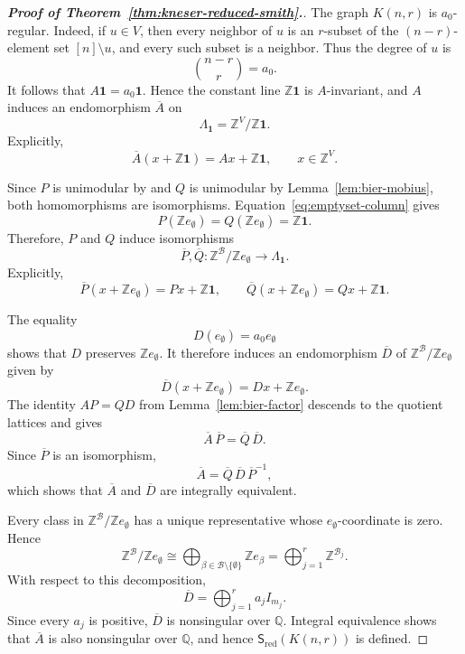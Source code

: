 \documentclass[11pt,reqno]{amsart}
\theoremstyle{plain}
\theoremstyle{definition}
\theoremstyle{remark}
\newcommand{\Sred}{\mathsf S_{\mathrm{red}}}
\newcommand{\Lamone}{\Lambda_{\mathbf1}}
\begin{document}
\begin{proof}[\textnormal{\textbf{Proof of Theorem~\ref{thm:kneser-reduced-smith}.}}]
The graph $K(n,r)$ is $a_0$-regular. Indeed, if $u\in V$, then every neighbor
of $u$ is an $r$-subset of the $(n-r)$-element set $[n]\setminus u$, and every
such subset is a neighbor. Thus the degree of $u$ is
\[
  \binom{n-r}{r}=a_0.
\]
It follows that $A\mathbf1=a_0\mathbf1$. Hence the constant line
$\mathbb Z\mathbf1$ is $A$-invariant, and $A$ induces an endomorphism
$\overline A$ on
\[
  \Lamone=\mathbb Z^V/\mathbb Z\mathbf1.
\]
Explicitly,
\[
  \overline A(x+\mathbb Z\mathbf1)
  =Ax+\mathbb Z\mathbf1,
  \qquad x\in\mathbb Z^V.
\]

Since $P$ is unimodular by \cite{Bie93} and $Q$ is unimodular by
Lemma~\ref{lem:bier-mobius}, both homomorphisms are isomorphisms.
Equation~\eqref{eq:emptyset-column} gives
\[
  P(\mathbb Ze_{\emptyset})
  =Q(\mathbb Ze_{\emptyset})
  =\mathbb Z\mathbf1.
\]
Therefore, $P$ and $Q$ induce isomorphisms
\[
  \overline P,\overline Q\colon
  \mathbb Z^{\mathcal B}/\mathbb Ze_{\emptyset}
  \longrightarrow
  \Lamone.
\]
Explicitly,
\[
  \overline P(x+\mathbb Ze_{\emptyset})
  =Px+\mathbb Z\mathbf1,
  \qquad
  \overline Q(x+\mathbb Ze_{\emptyset})
  =Qx+\mathbb Z\mathbf1.
\]

The equality
\[
  D(e_{\emptyset})=a_0e_{\emptyset}
\]
shows that $D$ preserves $\mathbb Ze_{\emptyset}$. It therefore
induces an endomorphism $\overline D$ of
$\mathbb Z^{\mathcal B}/\mathbb Ze_{\emptyset}$ given by
\[
  \overline D(x+\mathbb Ze_{\emptyset})
  =Dx+\mathbb Ze_{\emptyset}.
\]
The identity $AP=QD$ from Lemma~\ref{lem:bier-factor} descends to the quotient
lattices and gives
\[
  \overline A\,\overline P
  =\overline Q\,\overline D.
\]
Since $\overline P$ is an isomorphism,
\begin{equation}\label{eq:reduced-factorization}
  \overline A
  =\overline Q\,\overline D\,\overline P^{-1},
\end{equation}
which shows that $\overline A$ and $\overline D$ are integrally
equivalent.

Every class in $\mathbb Z^{\mathcal B}/\mathbb Ze_{\emptyset}$ has a unique
representative whose $e_{\emptyset}$-coordinate is zero. Hence
\[
  \mathbb Z^{\mathcal B}/\mathbb Ze_{\emptyset}
  \cong
  \bigoplus_{\beta\in\mathcal B\setminus\{\emptyset\}}
  \mathbb Ze_\beta
  =
  \bigoplus_{j=1}^r\mathbb Z^{\mathcal B_j}.
\]
With respect to this decomposition,
\begin{equation}\label{eq:reduced-diagonal}
  \overline D=\bigoplus_{j=1}^r a_jI_{m_j}.
\end{equation}
Since every $a_j$ is positive,
$\overline D$ is nonsingular over $\mathbb Q$. Integral equivalence shows
that $\overline A$ is also nonsingular over $\mathbb Q$, and hence
$\Sred(K(n,r))$ is defined.


\end{proof}
\end{document}
